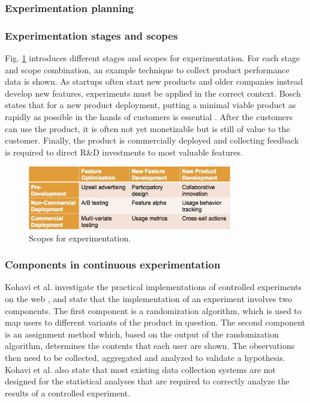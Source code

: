 \documentclass[english]{tktltiki2}
\theoremstyle{definition}
\theoremstyle{remark}
\begin{document}
\subsubsection{Experimentation planning}

\subsubsection{Experimentation stages and scopes}
Fig. \ref{fig4} introduces different stages and scopes for experimentation. For each stage and scope combination, an example technique to collect product performance data is shown. As startups often start new products and older companies instead develop new features, experiments must be applied in the correct context. Bosch states that for a new product deployment, putting a minimal viable product as rapidly as possible in the hands of customers is essential \cite{bosch2012building}. After the customers can use the product, it is often not yet monetizable but is still of value to the customer. Finally, the product is commercially deployed and collecting feedback is required to direct R\&D investments to most valuable features.
\begin{figure}[!htbp]
	\centering
	\includegraphics[width=3.5in]{scopes.jpg}
	\caption{Scopes for experimentation\cite{bosch2012building}.}
	\label{fig4}
\end{figure}

\subsubsection{Components in continuous experimentation}
Kohavi et al. investigate the practical implementations of controlled experiments on the web \cite{kohavi2007practical}, and state that the implementation of an experiment involves two components. The first component is a randomization algorithm, which is used to map users to different variants of the product in question. The second component is an assignment method which, based on the output of the randomization algorithm, determines the contents that each user are shown. The observations then need to be collected, aggregated and analyzed to validate a hypothesis. Kohavi et al. also state that most existing data collection systems are not designed for the statistical analyses that are required to correctly analyze the results of a controlled experiment.
\end{document}
